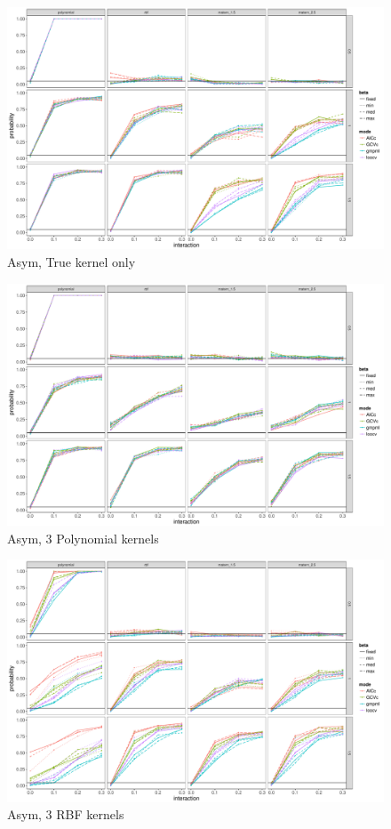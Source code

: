 \documentclass[11pt]{article}
\begin{document}
\clearpage
\begin{figure}
\begin{center}
\includegraphics[width=0.9\columnwidth]{exp_A1} 
\caption{Asym, True kernel only}
\label{fig:res}
\end{center}
\end{figure}

\begin{figure}
\begin{center}
\includegraphics[width=0.9\columnwidth]{exp_A2} 
\caption{Asym, 3 Polynomial kernels}
\label{fig:res}
\end{center}
\end{figure}

\begin{figure}
\begin{center}
\includegraphics[width=0.9\columnwidth]{exp_A3} 
\caption{Asym, 3 RBF kernels}
\label{fig:res}
\end{center}
\end{figure}
\end{document}
